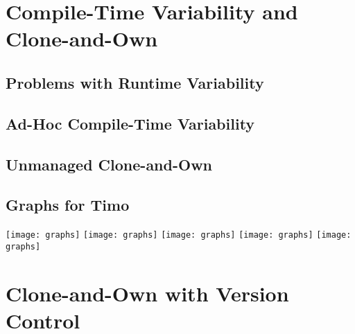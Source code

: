 \documentclass[
	aspectratio=169, %
	8pt, %
	handout, %
]{beamer}
\subtitle{3. Compile-Time Variability with Clone-and-Own}
\author{Timo Kehrer}
\begin{document}



\section{Compile-Time Variability and Clone-and-Own}




\subsection{Problems with Runtime Variability}
\subsection{Ad-Hoc Compile-Time Variability}
\subsection{Unmanaged Clone-and-Own}

\subsection{Graphs for Timo}
\begin{frame}{\insertsubsection}
	\begin{mycolumns}[columns=5]
		\texttt{[image: graphs]}
	\mynextcolumn
		\texttt{[image: graphs]}
	\mynextcolumn
		\texttt{[image: graphs]}
	\mynextcolumn
		\texttt{[image: graphs]}
	\mynextcolumn
		\texttt{[image: graphs]}
	\end{mycolumns}
\end{frame}

\lessonslearned{
	\item \ldots
}{
	\item \ldots
}{
	\item \ldots
}

\sectionend

\section{Clone-and-Own with Version Control}
\end{document}
